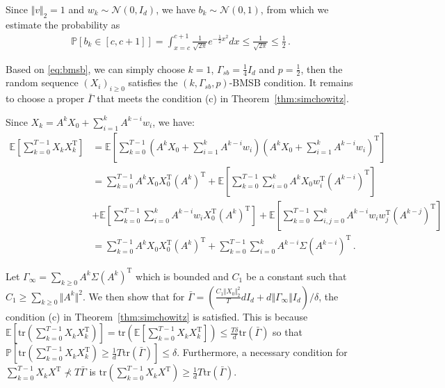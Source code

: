 \documentclass{article}
\theoremstyle{definition}
\begin{document}
Since $\Vert v\Vert _{2}=1$ and $w_{k}\sim\mathcal{N}(0,I_{d})$, we have $b_{k}\sim\mathcal{N}(0,1)$, from which we estimate the probability as
\begin{align}\label{eq:bmsb}
\mathbb{P}\left[b_{k}\in [c,c+1]\right]=\int_{x=c}^{c+1}\frac{1}{\sqrt{2\pi}}e^{-\frac{1}{2}x^{2}}dx\leq\frac{1}{\sqrt{2\pi}}\leq\frac{1}{2}\,.
\end{align}




Based on \eqref{eq:bmsb}, we can simply choose $k=1$, $\Gamma_{sb}=\frac{1}{4}I_{d}$ and $p=\frac{1}{2}$, then the random sequence $(X_{i})_{i\geq0}$ satisfies the $(k,\Gamma_{sb},p)$-BMSB condition. It remains to choose a proper $\bar{\Gamma}$ that meets the condition (c) in Theorem~\ref{thm:simchowitz}.

Since $X_{k}=A^{k}X_{0}+\sum_{i=1}^{k}A^{k-i}w_{i}$, we have:
\begin{align*}
\mathbb{E}\left[\sum_{k=0}^{T-1}X_{k}X^{\mathrm{T}}_{k}\right]&=\mathbb{E}\left[\sum_{k=0}^{T-1}\left(A^{k}X_{0}+\sum_{i=1}^{k}A^{k-i}w_{i}\right)\left(A^{k}X_{0}+\sum_{i=1}^{k}A^{k-i}w_{i}\right)^{\mathrm{T}}\right]\\
&=\sum_{k=0}^{T-1}A^{k}X_{0}X_{0}^{\mathrm{T}}(A^{k})^{\mathrm{T}}+\mathbb{E}\left[\sum_{k=0}^{T-1}\sum_{i=0}^{k}A^{k}X_{0}w_{i}^{\mathrm{T}}(A^{k-i})^{\mathrm{T}}\right]\\
&+\mathbb{E}\left[\sum_{k=0}^{T-1}\sum_{i=0}^{k}A^{k-i}w_{i}X_{0}^{\mathrm{T}}(A^{k})^{\mathrm{T}}\right]+\mathbb{E}\left[\sum_{k=0}^{T-1}\sum_{i,j=0}^{k}A^{k-i}w_{i}w^{\mathrm{T}}_{j}(A^{k-j})^{\mathrm{T}}\right]\\
&=\sum_{k=0}^{T-1}A^{k}X_{0}X_{0}^{\mathrm{T}}(A^{k})^{\mathrm{T}}+\sum_{k=0}^{T-1}\sum_{i=0}^{k}A^{k-i}\Sigma(A^{k-i})^{\mathrm{T}}\,.
\end{align*}

Let $\Gamma_{\infty}=\sum_{k\geq0}A^{k}\Sigma(A^{k})^{\mathrm{T}}$ which is bounded and $C_{1}$ be a constant such that $C_{1}\geq\sum_{k\geq0}\Vert A^{k}\Vert ^{2}$. We then show that for $\bar{\Gamma}=\left(\frac{C_{1}\Vert X_{0}\Vert ^{2}_{2}}{T}dI_{d}+d\Vert \Gamma_{\infty}\Vert I_{d}\right)/\delta$, the condition (c) in Theorem~\ref{thm:simchowitz} is satisfied. This is because $\mathbb{E}\left[\mathrm{tr}\left(\sum_{k=0}^{T-1}X_{k}X_{k}^{\mathrm{T}}\right)\right]=\mathrm{tr}\left(\mathbb{E}\left[\sum_{k=0}^{T-1}X_{k}X_{k}^{\mathrm{T}}\right]\right)\leq \frac{T\delta}{d}\mathrm{tr}(\bar{\Gamma})$ so that 
\\$\mathbb{P}\left[\mathrm{tr}(\sum_{k=0}^{T-1}X_{k}X_{k}^{\mathrm{T}})\geq \frac{1}{d}T\mathrm{tr}(\bar{\Gamma})\right]\leq\delta$. Furthermore, a necessary condition for \\$\sum_{k=0}^{T-1}X_{k}X^{\mathrm{T}}\not\prec T\bar{\Gamma}$ is $\mathrm{tr}(\sum_{k=0}^{T-1}X_{k}X^{\mathrm{T}})\geq \frac{1}{d}T\mathrm{tr}(\bar{\Gamma})$.
\end{document}
